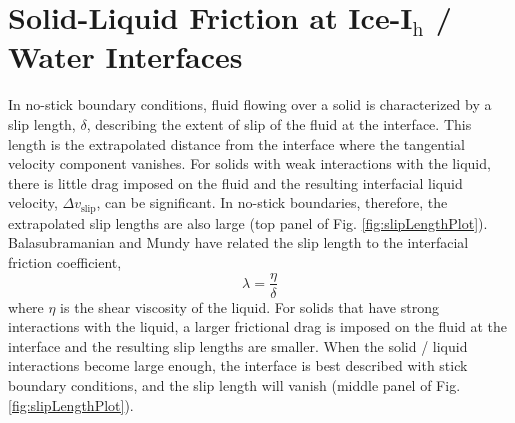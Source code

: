 


\section{Solid-Liquid Friction at Ice-I$_\mathrm{h}$ / Water Interfaces}
In no-stick boundary conditions, fluid flowing over a solid is
characterized by a slip length, $\delta$, describing the extent of
slip of the fluid at the interface. This length is the extrapolated
distance from the interface where the tangential velocity component
vanishes. For solids with weak interactions with the liquid, there is
little drag imposed on the fluid and the resulting interfacial liquid
velocity, $\Delta v_\mathrm{slip}$, can be significant. In no-stick
boundaries, therefore, the extrapolated slip lengths are also large
(top panel of Fig. \ref{fig:slipLengthPlot}).  Balasubramanian and
Mundy have related the slip length to the interfacial friction
coefficient, 
\begin{equation}\label{eq:kappa1}
\lambda = \frac{\eta}{\delta}
\end{equation}
where $\eta$ is the shear viscosity of the
liquid.\cite{Balasubramanian1999} For solids that have strong
interactions with the liquid, a larger frictional drag is imposed on
the fluid at the interface and the resulting slip lengths are
smaller. When the solid / liquid interactions become large enough, the
interface is best described with stick boundary conditions, and the
slip length will vanish (middle panel of
Fig. \ref{fig:slipLengthPlot}).


